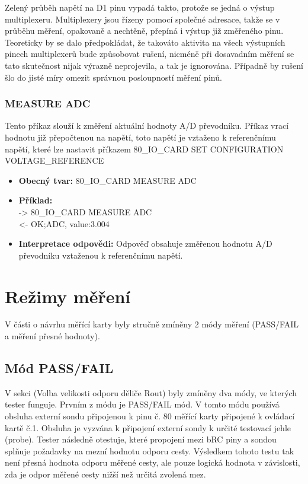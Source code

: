 Zelený průběh napětí na D1 pinu vypadá takto, protože se jedná o výstup multiplexeru. Multiplexery jsou řízeny pomocí společné adresace, takže
se v průběhu měření, opakovaně a nechtěně, přepíná i výstup již změřeného pinu. Teoreticky by se dalo předpokládat, že takováto aktivita na všech
výstupních pinech multiplexerů bude způsobovat rušení, nicméně při dosavadním měření se tato skutečnost nijak výrazně neprojevila, a tak je ignorována.
Případně by rušení šlo do jisté míry omezit správnou posloupností měření pinů.

\subsubsection{MEASURE ADC}
Tento příkaz slouží k změření aktuální hodnoty A/D převodníku. Příkaz vrací hodnotu již přepočtenou na napětí, 
toto napětí je vztaženo k referenčnímu napětí,
které lze nastavit příkazem 80\_IO\_CARD SET CONFIGURATION VOLTAGE\_REFERENCE

\begin{itemize}[leftmargin=*]
    \item \textbf{Obecný tvar:} 80\_IO\_CARD MEASURE ADC
    \item \textbf{Příklad:}\\
    -> 80\_IO\_CARD MEASURE ADC\\
    <- OK;ADC, value:3.004\\
    \item \textbf{Interpretace odpovědi:} Odpověď obsahuje změřenou hodnotu A/D převodníku vztaženou k referenčnímu napětí.
\end{itemize}

\section{Režimy měření}
V části o návrhu měřící karty byly stručně zmíněny 2 módy měření (PASS/FAIL a měření přesné hodnoty).

\subsection{Mód PASS/FAIL}
V sekci (Volba velikosti odporu děliče Rout) byly zmíněny dva módy, ve kterých tester funguje.
Prvním z módu je PASS/FAIL mód. V tomto módu používá obsluha externí sondu připojenou k pinu č. 80
měřící karty připojené k ovládací kartě č.1. Obsluha je vyzvána k připojení externí sondy k 
určité testovací jehle (probe). Tester následně otestuje, které propojení mezi bRC piny a sondou splňuje požadavky
na mezní hodnotu odporu cesty. Výsledkem tohoto testu tak není přesná hodnota odporu měřené cesty,
ale pouze logická hodnota v závislosti, zda je odpor měřené cesty nižší než určitá zvolená mez.\par

